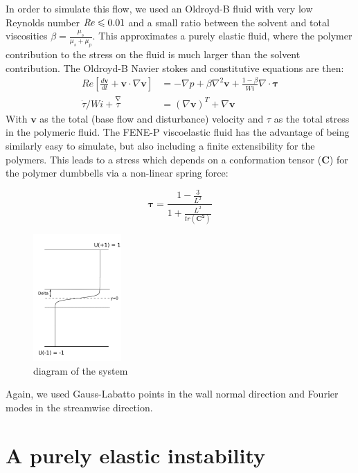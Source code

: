 \documentclass{jfm}
\newcommand{\dt}[1]{\frac{d #1}{d t}} %
\newcommand\Rey{\mbox{\textit{Re}}}  %
\begin{document}
In order to simulate this flow, we used an Oldroyd-B fluid with very low
Reynolds number $\Rey \leq 0.01$ and a small ratio between the solvent and total
viscosities $\beta = \frac{\mu_{s}}{\mu_{s}+\mu_{p}}$. This approximates a
purely elastic fluid, where the polymer contribution to the stress on the fluid
is much larger  than the solvent contribution. The Oldroyd-B Navier stokes and
constitutive equations are then: 
\begin{align} 
    Re \left[ \dt{\mathbf{v}} +
    \mathbf{v} \cdot \nabla  \mathbf{v} \right] &= - \nabla p + \beta
    \nabla^{2} \mathbf{v} + \frac{1-\beta}{Wi} \nabla \cdot \mathbf{\tau} \\
    \dot{\tau}/Wi + \overset{\nabla}\tau &= \left(\nabla \mathbf{v}\right)^{T}
    + \nabla{\mathbf{v}} 
\end{align} 
With $\mathbf{v}$ as the total (base flow and disturbance) velocity and $\tau$
as the total stress in the polymeric fluid. The FENE-P viscoelastic fluid has
the advantage of being similarly easy to simulate, but also including a finite
extensibility for the polymers. This leads to a stress which depends on a
conformation tensor ($\mathbf{C}$) for the polymer dumbbells via a non-linear
spring force:

\begin{equation} \mathbf{\tau} = \frac{1-\frac{3}{L^{2}}}{1 +
	\frac{L^{2}}{tr(\mathbf{C^{2}})}} \end {equation}

\begin{figure} 
    \centering 
    \includegraphics[width=0.3\textwidth]{KH_diagram}
    \caption{diagram of the system} 
    \label{fig:diagram} 
\end{figure}

Again, we used Gauss-Labatto points in the wall normal direction and Fourier
modes in the streamwise direction.

\section{A purely elastic instability}
\end{document}
